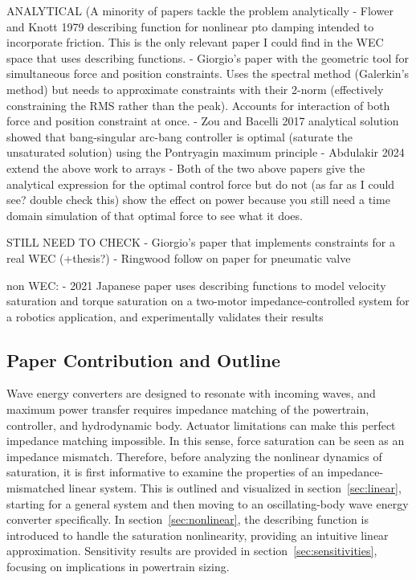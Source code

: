 \documentclass{ifacconf}
\begin{document}
ANALYTICAL (A minority of papers tackle the problem analytically
- Flower and Knott 1979 describing function for nonlinear pto damping intended to incorporate friction. This is the only relevant paper I could find in the WEC space that uses describing functions. \cite{flower_describing-function_1980}
- Giorgio's paper with the geometric tool for simultaneous force and position constraints. Uses the spectral method (Galerkin's method) but needs to approximate constraints with their 2-norm (effectively constraining the RMS rather than the peak). Accounts for interaction of both force and position constraint at once. \cite{bacelli_geometric_2013}
- Zou and Bacelli 2017 analytical solution showed that bang-singular arc-bang controller is optimal (saturate the unsaturated solution) using the Pontryagin maximum principle \cite{zou_optimal_2017}
- Abdulakir 2024 extend the above work to arrays \cite{abdulkadir_optimal_2024}
- Both of the two above papers give the analytical expression for the optimal control force but do not (as far as I could see? double check this) show the effect on power because you still need a time domain simulation of that optimal force to see what it does.

STILL NEED TO CHECK
- Giorgio's paper that implements constraints for a real WEC (+thesis?)
- Ringwood follow on paper for pneumatic valve

non WEC:
- 2021 Japanese paper uses describing functions to model velocity saturation and torque saturation on a two-motor impedance-controlled system for a robotics application, and experimentally validates their results \cite{fukui_impedance_2021}

\subsection{Paper Contribution and Outline}
Wave energy converters are designed to resonate with incoming waves, and maximum power transfer requires impedance matching of the powertrain, controller, and hydrodynamic body. Actuator limitations can make this perfect impedance matching impossible. In this sense, force saturation can be seen as an impedance mismatch. Therefore, before analyzing the nonlinear dynamics of saturation, it is first informative to examine the properties of an impedance-mismatched linear system. This is outlined and visualized in section~\ref{sec:linear}, starting for a general system and then moving to an oscillating-body wave energy converter specifically. In section~\ref{sec:nonlinear}, the describing function is introduced to handle the saturation nonlinearity, providing an intuitive linear approximation. Sensitivity results are provided in section~\ref{sec:sensitivities}, focusing on implications in powertrain sizing.
\end{document}
